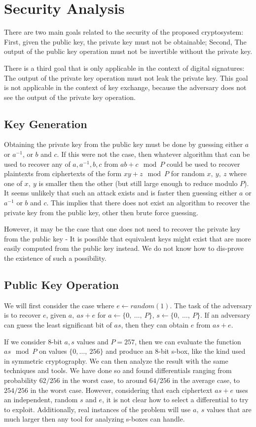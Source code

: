\documentclass[preprint]{iacrtrans}
\begin{document}
\section{Security Analysis}
There are two main goals related to the security of the proposed cryptosystem: First, given the public key, the private key must not be obtainable; Second, The output of the public key operation must not be invertible without the private key.

There is a third goal that is only applicable in the context of digital signatures: The output of the private key operation must not leak the private key. This goal is not applicable in the context of key exchange, because the adversary does not see the output of the private key operation.

\subsection{Key Generation}
Obtaining the private key from the public key must be done by guessing either $a$ or $a^{-1}$, or $b$ and $c$. If this were not the case, then whatever algorithm that can be used to recover any of $a, a^{-1}, b, c$ from $a b + c \mod P$ could be used to recover plaintexts from ciphertexts of the form $x y + z \mod P$ for random $x,\ y,\ z$ where one of $x,\ y$ is smaller then the other (but still large enough to reduce modulo $P$). It seems unlikely that such an attack exists and is faster then guessing either $a$ or $a^{-1}$ or $b$ and $c$. This implies that there does not exist an algorithm to recover the private key from the public key, other then brute force guessing.

However, it may be the case that one does not need to recover the private key from the public key - It is possible that equivalent keys might exist that are more easily computed from the public key instead. We do not know how to dis-prove the existence of such a possibility.

\subsection{Public Key Operation}
We will first consider the case where $e \leftarrow random(1)$. The task of the adversary is to recover $e$, given $a,\ a s + e$ for $a \leftarrow \{0,\ \dots,\ P\}$, $s \leftarrow \{0,\ \dots,\ P\}$. If an adversary can guess the least significant bit of $a s$, then they can obtain $e$ from $a s + e$.

If we consider 8-bit $a, s$ values and $P = 257$, then we can evaluate the function $a s \mod P$ on values $\{0,\dots,\ 256\}$ and produce an 8-bit s-box, like the kind used in symmetric cryptography. We can then analyze the result with the same techniques and tools. We have done so and found differentials ranging from probability $62/256$ in the worst case, to around $64/256$ in the average case, to $254/256$ in the worst case. However, considering that each ciphertext $a s + e$ uses an independent, random $s$ and $e$, it is not clear how to select a differential to try to exploit. Additionally, real instances of the problem will use $a,\ s$ values that are much larger then any tool for analyzing s-boxes can handle.
\end{document}
